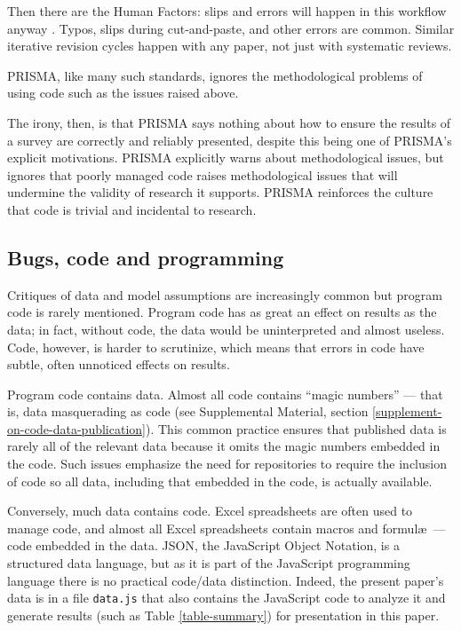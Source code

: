 \documentclass{comjnl}
\def\supplement{Supplemental Material}
\begin{document}
Then there are the Human Factors: slips and errors will happen in this workflow anyway \cite{engima}. Typos, slips during cut-and-paste, and other errors are common. Similar iterative revision cycles happen with any paper, not just with systematic reviews. 

PRISMA, like many such standards, ignores the methodological problems of using code such as the issues raised above. 

The irony, then, is that PRISMA says nothing about how to ensure the results of a survey are correctly and reliably presented, despite this being one of PRISMA's explicit motivations. PRISMA explicitly warns about methodological issues, but ignores that poorly managed code raises methodological issues that will undermine the validity of research it supports. PRISMA reinforces the culture that code is trivial and incidental to research.

\subsection{Bugs, code and programming}\label{knowledge}
Critiques of data and model assumptions are increasingly common \cite{critiques,diagnosis-reviews} but program code is rarely mentioned. Program code has as great an effect on results as the data; in fact, without code, the data would be uninterpreted and almost useless. Code, however, is harder to scrutinize, which means that errors in code have subtle, often unnoticed effects on results.

Program code contains data. Almost all code contains ``magic numbers'' --- that is, data masquerading as code (see \supplement, section \ref{supplement-on-code-data-publication}). This common practice ensures that published data is rarely all of the relevant data because it omits the magic numbers embedded in the code. Such issues emphasize the need for repositories to require the inclusion of code so all data, including that embedded in the code, is actually available. 

Conversely, much data contains code. Excel spreadsheets are often used to manage code, and almost all Excel spreadsheets contain macros and formul\ae\ --- code embedded in the data. JSON, the JavaScript Object Notation, is a structured data language, but as it is part of the JavaScript programming language there is no practical code/data distinction. Indeed, the present paper's data is in a file \texttt{data.js} that also contains the JavaScript code to analyze it and generate results (such as Table \ref{table-summary}) for presentation in this paper.
\end{document}
